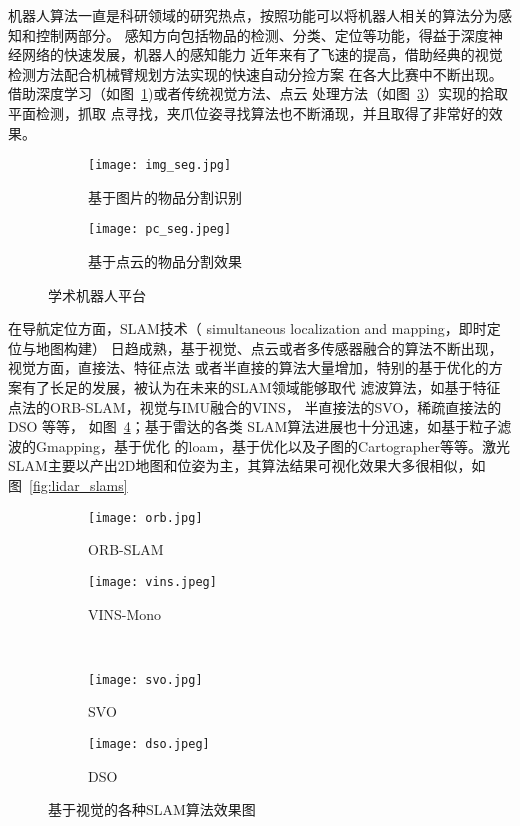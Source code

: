 机器人算法一直是科研领域的研究热点，按照功能可以将机器人相关的算法分为感知和控制两部分。
感知方向包括物品的检测、分类、定位等功能，得益于深度神经网络的快速发展，机器人的感知能力
近年来有了飞速的提高，借助经典的视觉检测方法配合机械臂规划方法实现的快速自动分捡方案
在各大比赛中不断出现。借助深度学习（如图~\ref{fig:img_seg})或者传统视觉方法、点云
处理方法（如图~\ref{fig:pc_seg}）实现的拾取平面检测，抓取
点寻找，夹爪位姿寻找算法也不断涌现，并且取得了非常好的效果。

\begin{figure}
\centering
\begin{subfigure}{.5\textwidth}
  \centering
  \texttt{[image: img\_seg.jpg]}
  \caption{基于图片的物品分割识别}
  \label{fig:img_seg}
\end{subfigure}%
\begin{subfigure}{.5\textwidth}
  \centering
  \texttt{[image: pc\_seg.jpeg]}
  \caption{基于点云的物品分割效果}
  \label{fig:pc_seg}
\end{subfigure}
\caption{学术机器人平台}
\end{figure}


在导航定位方面，SLAM技术（ simultaneous localization and mapping，即时定位与地图构建）
日趋成熟，基于视觉、点云或者多传感器融合的算法不断出现，视觉方面，直接法、特征点法
或者半直接的算法大量增加，特别的基于优化的方案有了长足的发展，被认为在未来的SLAM领域能够取代
滤波算法，如基于特征点法的ORB-SLAM\cite{mur2015orb}，视觉与IMU融合的VINS\cite{qin2018vins}，
半直接法的SVO\cite{forster2014svo}，稀疏直接法的DSO\cite{engel2017direct} 等等，
如图~\ref{fig:slams}；基于雷达的各类
SLAM算法进展也十分迅速，如基于粒子滤波的Gmapping\cite{grisettiyz2005improving}，基于优化
的loam\cite{zhang2014loam}，基于优化以及子图的Cartographer\cite{hess2016real}等等。激光
SLAM主要以产出2D地图和位姿为主，其算法结果可视化效果大多很相似，如图~\ref{fig:lidar_slams}

\begin{figure}
\centering
\begin{subfigure}{.6\textwidth}
  \centering
  \texttt{[image: orb.jpg]}
  \caption{ORB-SLAM}
\end{subfigure}%
\begin{subfigure}{.4\textwidth}
  \centering
  \texttt{[image: vins.jpeg]}
  \caption{VINS-Mono}
\end{subfigure}
\\
\begin{subfigure}{.59\textwidth}
  \centering
  \texttt{[image: svo.jpg]}
  \caption{SVO}
\end{subfigure}
\begin{subfigure}{.4\textwidth}
  \centering
  \texttt{[image: dso.jpeg]}
  \caption{DSO}
\end{subfigure}
\caption{基于视觉的各种SLAM算法效果图}
\label{fig:slams}
\end{figure}


